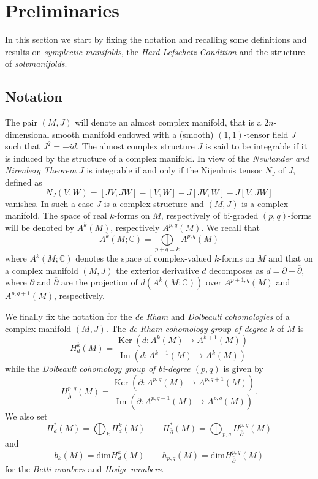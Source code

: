 \documentclass[a4paper, 11pt]{amsart}
\theoremstyle{plain}
\theoremstyle{definition}
\newcommand{\delbar}{\bar{\partial}}
\DeclareMathOperator{\Ker}{Ker}
\DeclareMathOperator{\im}{Im}
\numberwithin{equation}{section}
\begin{document}
{\section{Preliminaries}
In this section we start by fixing the notation and recalling some definitions and results on \textit{symplectic manifolds}, the \textit{Hard Lefschetz Condition} and the structure of \textit{solvmanifolds}.

\subsection{Notation} The pair $(M,J)$ will denote an almost complex manifold, that is a $2n$-dimensional smooth manifold endowed with a (smooth) $(1,1)$-tensor field $J$ such that $J^2=-id$. The almost complex structure $J$ is said to be integrable if it is induced by the structure of a complex manifold. In view of the \textit{Newlander and Nirenberg Theorem} $J$ is integrable if and only if the Nijenhuis tensor $N_J$ of $J$, defined as
$$
N_J(V,W)=[JV,JW]-[V,W]-J[JV,W]-J[V,JW]
$$
vanishes. In such a case $J$ is a complex structure and $(M,J)$ is a complex manifold. The space of real $k$-forms on $M$, respectively of bi-graded $(p,q)$-forms will be denoted by $A^{k}(M)$, respectively $A^{p,q}(M)$. We recall that
\[A^{k}(M; \mathbb{C}) = \underset{p + q = k}{\bigoplus}A^{p,q}(M)\]
where $A^{k}(M; \mathbb{C})$ denotes the space of complex-valued $k$-forms on $M$ and that on a complex manifold $(M,J)$ the exterior derivative $d$ decomposes as $d = \partial + \overline{\partial}$, where $\partial$ and $\overline{\partial}$ are the projection of $d(A^{k}(M; \mathbb{C}))$ over $A^{p+1,q}(M)$ and $A^{p,q+1}(M)$, respectively.\\ 

We finally fix the notation for the \textit{de Rham} and \textit{Dolbeault} \textit{cohomologies} of a complex manifold $(M,J)$. The \textit{de Rham cohomology group of degree $k$} of $M$ is 
\[ H^{k}_{d}(M) = \dfrac{\Ker(d: A^{k}(M) \rightarrow A^{k+1}(M))}{\im(d: A^{k-1}(M) \rightarrow A^{k}(M))}\]
while the \textit{Dolbeault cohomology group of bi-degree $(p,q)$} is given by
\[H^{p,q}_{\overline{\partial}}(M) = \dfrac{\Ker(\overline{\partial}: A^{p,q}(M) \rightarrow A^{p,q+1}(M))}{\im(\overline{\partial}: A^{p,q-1}(M) \rightarrow A^{p,q}(M))}.\]
We also set
\[H^{*}_{d}(M) = \bigoplus_{k}H^{k}_{d}(M) \qquad H^{*}_{\delbar}(M) = \bigoplus_{p,q}H^{p,q}_{\delbar}(M)\]
and
\[b_{k}(M) = \text{dim}H^{k}_{d}(M) \qquad h_{p,q}(M) = \text{dim}H^{p,q}_{\delbar}(M)\]
for the \textit{Betti numbers} and \textit{Hodge numbers}.

}
\end{document}
